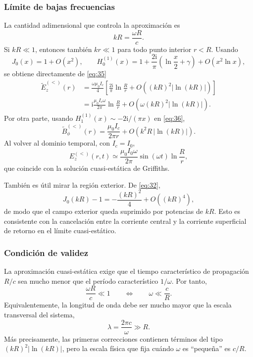 \documentclass{article}
\numberwithin{equation}{section}
\newcommand{\iu}{\mathrm{i}}
\begin{document}
\subsubsection{Límite de bajas frecuencias}

La cantidad adimensional que controla la aproximación es
\begin{equation*}
    kR=\frac{\omega R}{c}.
\end{equation*}
Si $kR\ll1$, entonces también $kr\ll1$ para todo punto interior $r<R$. Usando
\begin{equation*}
J_0(x)=1+O(x^2),
\qquad
H_0^{(1)}(x)=1+\frac{2\iu}{\pi}
\left(\ln\frac{x}{2}+\gamma\right)+O(x^2\ln x),
\end{equation*}
se obtiene directamente de \eqref{eq:35}
\begin{align*}
\widetilde E_z^{(<)}(r)
&=\frac{\omega\mu_0 I_c}{4}
\left[\frac{2\iu}{\pi}\ln\frac{R}{r}
+O\!\left((kR)^2\lvert\ln(kR)\rvert\right)\right]\\
&=\iu\frac{\mu_0 I_c\omega}{2\pi}\ln\frac{R}{r}
+O\!\left(\omega(kR)^2\lvert\ln(kR)\rvert\right).
\end{align*}
Por otra parte, usando $H_1^{(1)}(x)\sim-2\iu/(\pi x)$ en \eqref{eq:36},
\begin{equation*}
    \widetilde B_{\phi}^{(<)}(r)
    =\frac{\mu_0 I_c}{2\pi r}
    +O\!\left(k^2R\,\lvert\ln(kR)\rvert\right).
\end{equation*}
Al volver al dominio temporal, con $I_c=I_0$,
\begin{equation*}
    E_z^{(<)}(r,t)
    \simeq
    \frac{\mu_0 I_0\omega}{2\pi}
    \sin(\omega t)\ln\frac{R}{r},
\end{equation*}
que coincide con la solución cuasi-estática de Griffiths.

También es útil mirar la región exterior. De \eqref{eq:32},
\begin{equation*}
J_0(kR)-1=-\frac{(kR)^2}{4}+O((kR)^4),
\end{equation*}
de modo que el campo exterior queda suprimido por potencias de $kR$. Esto es consistente con la cancelación entre la corriente central y la corriente superficial de retorno en el límite cuasi-estático.

\subsubsection{Condición de validez}

La aproximación cuasi-estática exige que el tiempo característico de propagación $R/c$ sea mucho menor que el período característico $1/\omega$. Por tanto,
\begin{equation*}
    \boxed{\frac{\omega R}{c}\ll1}
    \qquad\Longleftrightarrow\qquad
    \boxed{\omega\ll\frac{c}{R}}.
\end{equation*}
Equivalentemente, la longitud de onda debe ser mucho mayor que la escala transversal del sistema,
\begin{equation*}
    \lambda=\frac{2\pi c}{\omega}\gg R.
\end{equation*}
Más precisamente, las primeras correcciones contienen términos del tipo $(kR)^2\lvert\ln(kR)\rvert$, pero la escala física que fija cuándo $\omega$ es ``pequeña'' es $c/R$.
\end{document}
